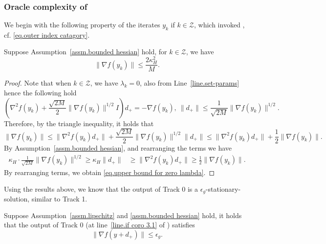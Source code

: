 \documentclass{article}
\begin{document}
\subsubsection{Oracle complexity of }\label{sec.oracle compl}
We begin with the following property of the iterates $y_k$ if $k\in\mathcal{Z}$, which invoked , cf. \eqref{eq.outer index catagory}.
\begin{lemma}
    \label{lem.upper bound for zero lambda}
    Suppose Assumption~\ref{assm.bounded hessian} hold, for $k\in \mathcal{Z}$, we have
    \begin{equation}
        \label{eq.upper bound for zero lambda}
        \|\nabla f(y_k)\|\leq \frac{2\kappa_H^2}{M}.
    \end{equation}
\end{lemma}
\begin{proof}
    Note that when $k\in \mathcal{Z}$, we have $\lambda_k =0$, also from Line~\ref{line.set-params} hence the following hold
    \begin{equation*}
        \left (\nabla^2 f(y_k)+\frac{\sqrt{2M}}{2}\|\nabla f(y_k)\|^{1/2} I\right )d_+ = -\nabla f(y_k), \ \|d_+\| \leq \frac{1}{\sqrt{2M}}\|\nabla f(y_k)\|^{1/2}.
    \end{equation*}
    Therefore, by the triangle inequality, it holds that
    \begin{equation*}
        \|\nabla f(y_k)\| \leq \|\nabla^2 f(y_k) d_+\| +\frac{\sqrt{2M}}{2}\|\nabla f(y_k)\|^{1/2}\|d_+\| \leq \|\nabla^2 f(y_k) d_+\|+\frac{1}{2}\|\nabla f(y_k)\|.
    \end{equation*}
    By Assumption~\ref{assm.bounded hessian}, and rearranging the terms we have
    \begin{equation*}
        \begin{aligned}
            \kappa_H \cdot \frac{1}{\sqrt{2M}}\|\nabla f(y_k)\|^{1/2}  \geq \kappa_H \|d_+\| & \geq \|\nabla^2 f(y_k) d_+\|       \geq \frac{1}{2}\|\nabla f(y_k)\|.
        \end{aligned}
    \end{equation*}
    By rearranging terms, we obtain \eqref{eq.upper bound for zero lambda}.
\end{proof}
Using the results above, we know that the output of {Track 0} is a $\epsilon_g$-stationary-solution, similar to Track 1.
\begin{corollary}
    \label{coro.second et}
    Suppose Assumption~\ref{assm.lipschitz} and \ref{assm.bounded hessian} hold,
    it holds that the output of {Track 0} (at line~\ref{line.if coro 3.1} of ) satisfies
    \begin{equation*}
        \|\nabla f(y+d_+)\|\leq \epsilon_g.
    \end{equation*}
\end{corollary}
\end{document}
